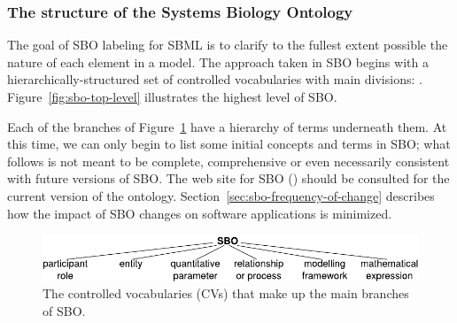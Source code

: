 \subsubsection{The structure of the Systems Biology Ontology}

The goal of SBO labeling for SBML is to clarify to the fullest
extent possible the nature of each element in a model.  The
approach taken in SBO begins with a hierarchically-structured set
of controlled vocabularies with  main divisions: .
Figure~\vref{fig:sbo-top-level} illustrates the highest level of
SBO.

Each of the  branches of Figure~\ref{fig:sbo-top-level} have a
hierarchy of terms underneath them.  At this time, we can only
begin to list some initial concepts and terms in SBO; what follows
is not meant to be complete, comprehensive or even necessarily
consistent with future versions of SBO.  The web site for SBO
(\sboref) should be consulted for the current version of the
ontology.  Section~\ref{sec:sbo-frequency-of-change} describes how
the impact of SBO changes on software applications is minimized.

\begin{figure}[tbh]
  \vspace*{1ex}
  \centering
  \includegraphics[scale = 0.8]{figs/sbo-top-level}
  \vspace*{1ex}
  \caption{The  controlled vocabularies (CVs) that
      make up the main branches of SBO.}
  \label{fig:sbo-top-level}
\end{figure}

